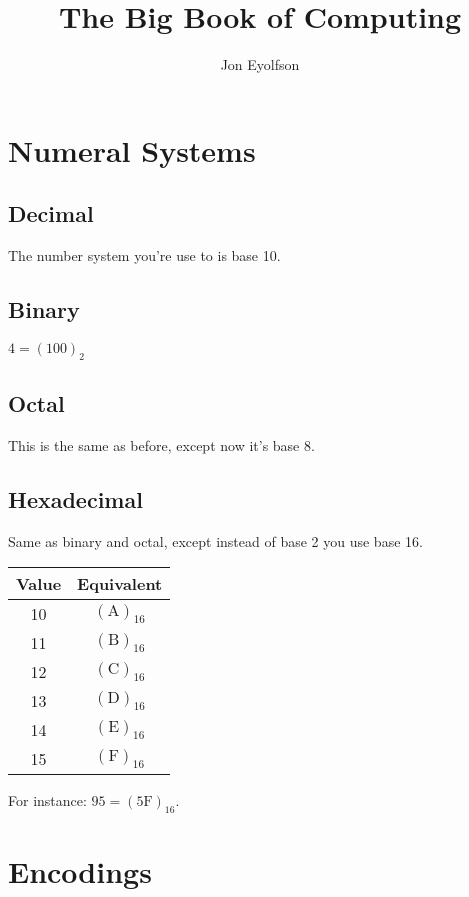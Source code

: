\documentclass[12pt]{book}
\title{The Big Book of Computing}
\author{Jon Eyolfson}
\begin{document}
  \maketitle

  \tableofcontents

  \chapter{Numeral Systems}

  \section{Decimal}

  The number system you're use to is base 10.

  \section{Binary}

  $4 = (100)_2$

  \section{Octal}

  This is the same as before, except now it's base 8.

  \section{Hexadecimal}

  Same as binary and octal, except instead of base 2 you use base 16.

  \begin{tabular}{c c}
    \hline
    Value & Equivalent \\
    \hline
    10 & $(\text{A})_{16}$ \\
    11 & $(\text{B})_{16}$ \\
    12 & $(\text{C})_{16}$ \\
    13 & $(\text{D})_{16}$ \\
    14 & $(\text{E})_{16}$ \\
    15 & $(\text{F})_{16}$ \\
  \end{tabular}

  For instance: $95 = (5\text{F})_{16}$.

  \chapter{Encodings}
\end{document}
